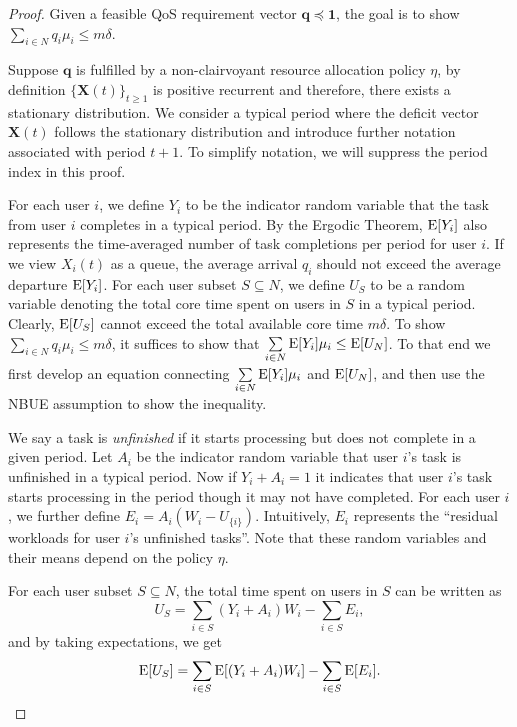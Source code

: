\documentclass[prodmode,acmtompecs]{acmsmall}
\newcommand{\reqvec}{\mathbf{q}}
\newcommand{\fullUserSet}{N}
\begin{document}
\begin{proof}
Given a feasible QoS requirement vector $\reqvec \preceq \mathbf{1}$, the goal is to show $\sum\limits_{i\in \fullUserSet} q_i\mu_i \leq m\delta$. 

Suppose $\reqvec$ is fulfilled by a non-clairvoyant resource allocation policy $\eta$, by definition $\{ \mathbf{X}(t)\}_{t \geq 1}$ is positive recurrent and therefore, there exists a stationary distribution. 
We consider a typical period where the deficit vector $\mathbf{X}(t)$ follows the stationary distribution and introduce further notation associated with period $t+1$. To simplify notation, we will suppress the period index in this proof. 

For each user $i$, we define $Y_i$ to be the indicator random variable that the task from user $i$ completes in a typical period. By the Ergodic Theorem, $\operatorname*{\mathrm{E}}[Y_i]$ also represents the time-averaged number of task completions per period for user $i$. If we view $X_i(t)$ as a queue, the average arrival $q_i$ should not exceed the average departure $\operatorname*{\mathrm{E}}[Y_i]$. For each user subset $S\subseteq \fullUserSet$, we define $U_S$ to be a random variable denoting the total core time spent on users in $S$ in a typical period. Clearly, $\operatorname*{\mathrm{E}}[U_S]$ cannot exceed the total available core time $m\delta$. To show $\sum\limits_{i\in \fullUserSet} q_i\mu_i \leq m\delta$, it suffices to show that $\sum\limits_{i\in \fullUserSet} \expectation[Y_i]\mu_i \leq \expectation[U_{\fullUserSet}]$. To that end we first develop an equation connecting $\sum\limits_{i\in \fullUserSet} \expectation[Y_i]\mu_i$ and $\expectation[U_{\fullUserSet}]$, and then use the NBUE assumption to show the inequality. 

We say a task is {\em unfinished} if it starts processing but does not complete in a given period. Let $A_i$ be the indicator random variable that user $i$'s task is unfinished in a typical period. Now if $Y_i + A_i = 1$ it indicates that user $i$'s task starts processing in the period though it may not have completed. 
For each user $i$, we further define $E_i = A_i(W_i - U_{\{i\}})$. Intuitively, $E_i$ represents the ``residual workloads for user $i$'s unfinished tasks''. 
Note that these random variables and their means depend on the policy $\eta$. 

For each user subset $S \subseteq \fullUserSet$, the total time spent on users in $S$ can be written as
$$
U_S = \sum\limits_{i\in S} (Y_i + A_i) W_i - \sum\limits_{i\in S} E_i, 
$$
and by taking expectations, we get
\begin{align}
\label{align_internal_exp}
\operatorname*{\mathrm{E}}[U_S] = \sum\limits_{i\in S} \operatorname*{\mathrm{E}}[(Y_i + A_i) W_i] - \sum\limits_{i\in S} \operatorname*{\mathrm{E}}[E_i]. 
\end{align}


\end{proof}
\end{document}
